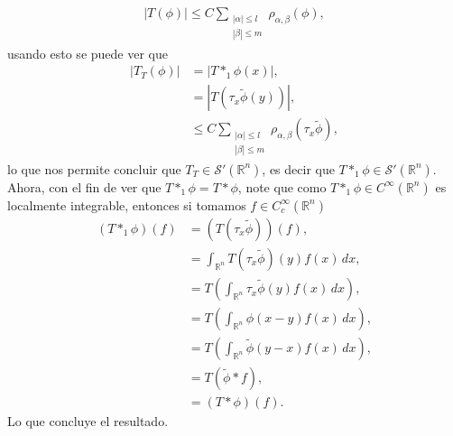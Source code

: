 \begin{homeworkProblem}
\begin{solution}
      \begin{align*}
        |T(\phi)|\leq C\sum_{\substack{|\alpha|\leq l\\ |\beta|\leq m}}\rho_{\alpha,\beta}(\phi),
      \end{align*}
      usando esto se puede ver que
      \begin{align*}
        |T_{T}(\phi)|&=\left| T*_{1}\phi(x) \right|,\\
        &=\left| T\left( \tau_{x}\tilde{\phi}(y) \right) \right|,\\
        &\leq C\sum_{\substack{|\alpha|\leq l\\|\beta|\leq m}}\rho_{\alpha,\beta}(\tau_{x}\tilde{\phi}),
      \end{align*}
      lo que nos permite concluir que $T_{T}\in\mathcal{S}'(\mathbb{R}^{n})$, es decir que $T*_{1}\phi\in\mathcal{S}'(\mathbb{R}^{n})$.\\
      Ahora, con el fin de ver que $T*_{1}\phi=T*\phi$, note que como $T*_{1}\phi\in C^{\infty}(\mathbb{R}^{n})$ es localmente integrable, entonces si tomamos $f\in C^{\infty}_{c}(\mathbb{R}^{n})$
      \begin{align*}
        \left( T*_{1}\phi \right)(f)&=\left( T(\tau_{x}\tilde{\phi}) \right)(f),\\
        &=\int_{\mathbb{R}^{n}}T(\tau_{x}\tilde{\phi})(y)f(x)\, dx,\\
        &=T\left( \int_{\mathbb{R}^{n}}\tau_{x}\tilde{\phi}(y)f(x)\, dx \right),\\
        &=T\left( \int_{\mathbb{R}^{n}}\phi(x-y)f(x)\, dx \right),\\
        &=T\left( \int_{\mathbb{R}^{n}}\tilde{\phi}(y-x)f(x)\, dx \right),\\
        &=T\left( \tilde{\phi}*f \right),\\
        &=(T*\phi)(f).
      \end{align*}
      Lo que concluye el resultado.
  \end{solution}
\end{homeworkProblem}
